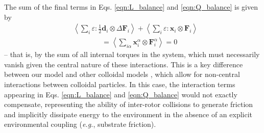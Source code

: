\documentclass[%
 reprint,
superscriptaddress,
longbibliography,
 amsmath,amssymb,
 prl,
 citeautoscript,
]{revtex4-1}
\begin{document}
The sum of the final terms in Eqs. \ref{eqn:L_balance} and \ref{eqn:Q_balance} is given by
\begin{equation}
\begin{split}
&\left\langle \sum_i \varepsilon : \frac{1}{2} {\boldsymbol d}_i \otimes \Delta {\boldsymbol F}_i \right\rangle + \left\langle \sum_i \varepsilon : {\boldsymbol x}_i \otimes {\boldsymbol F}_i \right\rangle \\
&\quad\quad\quad\quad= \left\langle \sum_{i\alpha} {\boldsymbol x}_i^{\alpha} \otimes {\boldsymbol F}_i^{\alpha} \right\rangle = 0
\end{split}
\label{eqn:interaction_sum}
\end{equation}
-- that is, by the sum of all internal torques in the system, which must necessarily vanish given the central nature of these interactions. This is a key difference between our model and other colloidal models \cite{free_surface, Vitellis_pretty_pictures}, which allow for non-central interactions between colloidal particles. In this case, the interaction terms appearing in Eqs. \ref{eqn:L_balance} and \ref{eqn:Q_balance} would not exactly compensate, representing the ability of inter-rotor collisions to generate friction and implicitly dissipate energy to the environment in the absence of an explicit environmental coupling ({\it e.g.}, substrate friction).
\end{document}
